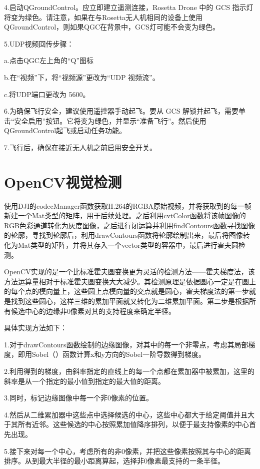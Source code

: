 4.启动QGroundControl。应立即建立遥测连接，Rosetta Drone 中的 GCS 指示灯将变为绿色。请注意，如果在与Rosetta无人机相同的设备上使用QGroundControl，则如果QGC在背景中，GCS灯可能不会变为绿色。

5.UDP视频回传步骤：

a.点击QGC左上角的“Q”图标

b.在“视频”下，将“视频源”更改为“UDP 视频流”。

c.将UDP端口更改为 5600。

6.为确保飞行安全，建议使用遥控器手动起飞。要从 GCS 解锁并起飞，需要单击“安全启用”按钮。它将变为绿色，并显示“准备飞行”。然后使用QGroundControl起飞或启动任务功能。

7.飞行后，确保在接近无人机之前启用安全开关。

\section{OpenCV视觉检测}

使用DJI的codecManager函数获取H.264的RGBA原始视频，并将获取到的每一帧新建一个Mat类型的矩阵，用于后续处理。之后利用cvtColor函数将该帧图像的RGB色彩通道转化为灰度图像，之后进行闭运算并利用findContours函数寻找图像的轮廓，寻找到轮廓后，利用drawContours函数将轮廓绘制出来，最后将图像转化为Mat类型的矩阵，并将其存入一个vector类型的容器中，最后进行霍夫圆检测。

OpenCV实现的是一个比标准霍夫圆变换更为灵活的检测方法——霍夫梯度法，该方法运算量相对于标准霍夫圆变换大大减少。其检测原理是依据圆心一定是在圆上的每个点的模向量上，这些圆上点模向量的交点就是圆心，霍夫梯度法的第一步就是找到这些圆心，这样三维的累加平⾯就又转化为二维累加平面。第二步是根据所有候选中心的边缘非0像素对其的支持程度来确定半径。

具体实现方法如下：

1.对于drawContours函数绘制的边缘图像，对其中的每一个非零点，考虑其局部梯度，即用Sobel（）函数计算x和y方向的Sobel⼀阶导数得到梯度。

2.利用得到的梯度，由斜率指定的直线上的每一个点都在累加器中被累加，这⾥的斜率是从一个指定的最小值到指定的最大值的距离。

3.同时，标记边缘图像中每一个非0像素的位置。

4.然后从二维累加器中这些点中选择候选的中心，这些中心都大于给定阈值并且大于其所有近邻。这些候选的中心按照累加值降序排列，以便于最支持像素的中心首先出现。

5.接下来对每⼀个中心，考虑所有的非0像素，并把这些像素按照其与中心的距离排序。从到最大半径的最小距离算起，选择非0像素最支持的⼀条半径。

